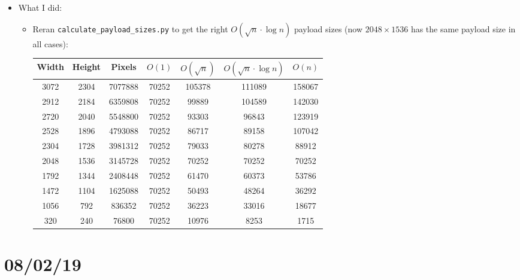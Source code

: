 \documentclass[11pt,a4paper]{report}
\begin{document}
\begin{itemize}

  \item What I did:
    \begin{itemize}
      \item Reran \texttt{calculate\_payload\_sizes.py} to get the right $O(\sqrt{n}\cdot\log{n})$ payload sizes (now $2048\times1536$ has the same payload size in all cases):
      \begin{center}
        \begin{tabular}{ c c c | c c c c }
        Width & Height & Pixels & $O(1)$ & $O(\sqrt{n})$ & $O(\sqrt{n} \cdot \log n)$ & $O(n)$ \\ \hline
        3072 & 2304 & 7077888 & 70252 & 105378 & 111089 & 158067 \\
        2912 & 2184 & 6359808 & 70252 & 99889 & 104589 & 142030 \\
        2720 & 2040 & 5548800 & 70252 & 93303 & 96843 & 123919 \\
        2528 & 1896 & 4793088 & 70252 & 86717 & 89158 & 107042 \\
        2304 & 1728 & 3981312 & 70252 & 79033 & 80278 & 88912 \\
        2048 & 1536 & 3145728 & 70252 & 70252 & 70252 & 70252 \\
        1792 & 1344 & 2408448 & 70252 & 61470 & 60373 & 53786 \\
        1472 & 1104 & 1625088 & 70252 & 50493 & 48264 & 36292 \\
        1056 & 792 & 836352 & 70252 & 36223 & 33016 & 18677 \\
        320 & 240 & 76800 & 70252 & 10976 & 8253 & 1715 \\
        \end{tabular}
      \end{center}
    \end{itemize}

\end{itemize}

\section{08/02/19}
\end{document}
